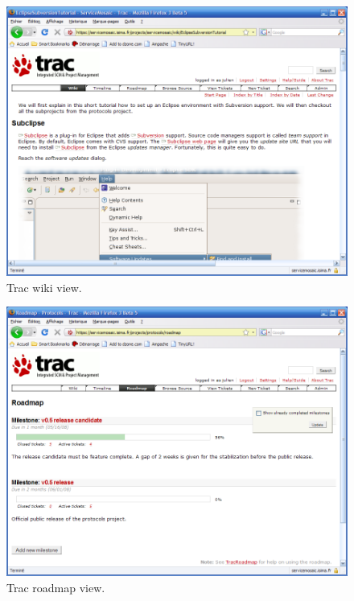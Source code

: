 \begin{figure}[tbhp]
    \centering
    \includegraphics[width=\textwidth]{content/protocols-project/trac-wiki}
    \caption{Trac wiki view.}
    \label{fig:trac-wiki}
\end{figure}

\begin{figure}[tbhp]
    \centering
    \includegraphics[width=\textwidth]{content/protocols-project/trac-roadmap}
    \caption{Trac roadmap view.}
    \label{fig:trac-roadmap}
\end{figure}

